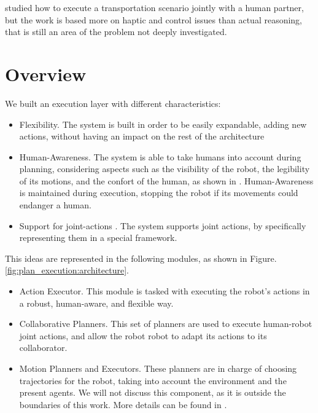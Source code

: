 \cite{bussy2012proactive} studied how to execute a transportation scenario jointly with a human partner, but the work is based more on haptic and control issues than actual reasoning, that is still an area of the problem not deeply investigated.

\section{Overview}
\label{sec:plan_execution-overview}

We built an execution layer with different characteristics:
\begin{itemize}
\item Flexibility. The system is built in order to be easily expandable, adding new actions, without having an impact on the rest of the architecture
\item Human-Awareness. The system is able to take humans into account during planning, considering aspects such as the visibility of the robot, the legibility of its motions, and the confort of the human, as shown in . Human-Awareness is maintained during execution, stopping the robot if its movements could endanger a human.
\item Support for joint-actions . The system supports joint actions, by specifically representing them in a special framework.
\end{itemize}

This ideas are represented in the following modules, as shown in Figure. \ref{fig:plan_execution:architecture}.
\begin{itemize}
	\item Action Executor. This module is tasked with executing the robot's actions in a robust, human-aware, and flexible way.
	\item Collaborative Planners. This set of planners are used to execute human-robot joint actions, and allow the robot robot to adapt its actions to its collaborator.
	\item Motion Planners and Executors. These planners are in charge of choosing trajectories for the robot, taking into account the environment and the present agents. We will not discuss this component, as it is outside the boundaries of this work. More details can be found in \cite{Sisbot2008,Mainprice2011,Pandey2010}.
\end{itemize}


